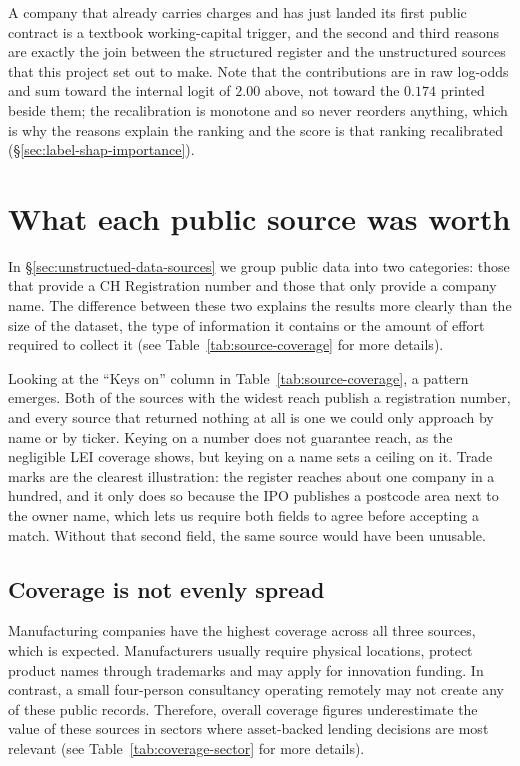 \documentclass[    author={Samuel Menon Demelo; Sneha Saphala Ram Prasad; 
Viktor Ander Lindholm; Vishal Khatri},
               supervisor={Prof. Fernando Moreno-Pino},
                   degree={MSc},
                    title={Lloyds Commercial Banking Intelligence},
                 subtitle={Ranking SME Lending, Risk and Growth Prospects for Lloyds Banking Group},
                     type={},
                     year={2026}]{dissertation}
\begin{document}
A company that already carries charges and has just landed its first public contract is a textbook working-capital trigger, and the second and third reasons are exactly the join between the structured register and the unstructured sources that this project set out to make. Note that the contributions are in raw log-odds and sum toward the internal logit of $2.00$ above, not toward the $0.174$ printed beside them; the recalibration is monotone and so never reorders anything, which is why the reasons explain the ranking and the score is that ranking recalibrated (\S\ref{sec:label-shap-importance}). 

\section{What each public source was worth}
\label{sec:sources-eval}
In \S\ref{sec:unstructued-data-sources} we group public data into two categories: those that provide a CH Registration number and those that only provide a company name. The difference between these two explains the results more clearly than the size of the dataset, the type of information it contains or the amount of effort required to collect it (see Table~\ref{tab:source-coverage} for more details).

Looking at the ``Keys on'' column in Table~\ref{tab:source-coverage}, a pattern emerges. Both of the sources with the widest reach publish a registration number, and every source that returned nothing at all is one we could only approach by name or by ticker. Keying on a number does not guarantee reach, as the negligible LEI coverage shows, but keying on a name sets a ceiling on it. Trade marks are the clearest illustration: the register reaches about one company in a hundred, and it only does so because the IPO publishes a postcode area next to the owner name, which lets us require both fields to agree before accepting a match. Without that second field, the same source would have been unusable.

\subsection{Coverage is not evenly spread}

Manufacturing companies have the highest coverage across all three sources, which is expected. Manufacturers usually require physical locations, protect product names through trademarks and may apply for innovation funding. In contrast, a small four-person consultancy operating remotely may not create any of these public records. Therefore, overall coverage figures underestimate the value of these sources in sectors where asset-backed lending decisions are most relevant (see Table~\ref{tab:coverage-sector} for more details).
\end{document}
